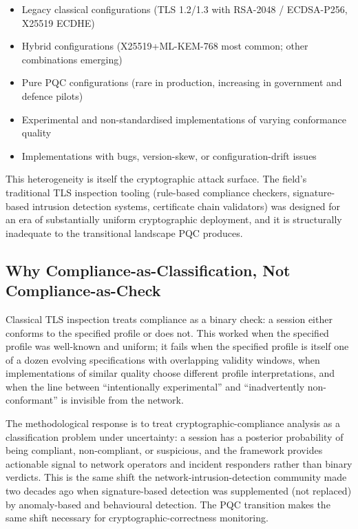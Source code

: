 \documentclass[sigconf,nonacm]{acmart}
\begin{document}
\begin{itemize}
  \item Legacy classical configurations (TLS 1.2/1.3 with RSA-2048
        / ECDSA-P256, X25519 ECDHE)
  \item Hybrid configurations (X25519+ML-KEM-768 most common; other
        combinations emerging)
  \item Pure PQC configurations (rare in production, increasing in
        government and defence pilots)
  \item Experimental and non-standardised implementations of varying
        conformance quality
  \item Implementations with bugs, version-skew, or
        configuration-drift issues
\end{itemize}

This heterogeneity is itself the cryptographic attack surface. The
field's traditional TLS inspection tooling (rule-based compliance
checkers, signature-based intrusion detection systems, certificate
chain validators) was designed for an era of substantially uniform
cryptographic deployment, and it is structurally inadequate to the
transitional landscape PQC produces.

\subsection{Why Compliance-as-Classification, Not Compliance-as-Check}

Classical TLS inspection treats compliance as a binary check: a
session either conforms to the specified profile or does not. This
worked when the specified profile was well-known and uniform; it
fails when the specified profile is itself one of a dozen evolving
specifications with overlapping validity windows, when implementations
of similar quality choose different profile interpretations, and when
the line between ``intentionally experimental'' and ``inadvertently
non-conformant'' is invisible from the network.

The methodological response is to treat cryptographic-compliance
analysis as a classification problem under uncertainty: a session
has a posterior probability of being compliant, non-compliant, or
suspicious, and the framework provides actionable signal to network
operators and incident responders rather than binary verdicts. This
is the same shift the network-intrusion-detection community made
two decades ago when signature-based detection was supplemented (not
replaced) by anomaly-based and behavioural detection. The PQC
transition makes the same shift necessary for cryptographic-correctness
monitoring.
\end{document}
